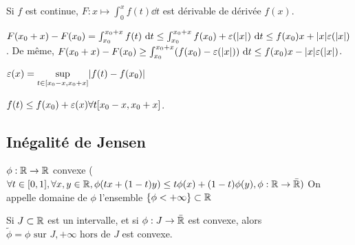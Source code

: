 \documentclass[10pt,a4paper,notitlepage ]{report}
\begin{document}
\begin{propriete}
	Si $f$ est continue, $F : x \mapsto \int_0^x f(t)\dd t$ est dérivable de dérivée $f(x)$.
\end{propriete}
\begin{demo}
	$F(x_0+x) - F(x_0) =  \int_{x_0}^{x_0+x} f(t)\ \mathrm d t \le \int_{x_0}^{x_0+x} f(x_0) + \varepsilon(|x|) \ \mathrm d t \le f(x_0)x + |x|\varepsilon(|x|)$. De même, $F(x_0+x) - F(x_0) \ge \int_{x_0}^{x_0+x}(f(x_0)-\varepsilon(|x|))\ \mathrm d t \le f(x_0)x-|x|\varepsilon(|x|)$.
	
	$\varepsilon(x) = \underset{t\in [x_0-x, x_0+x]}\sup |f(t)-f(x_0)|$
	
	$f(t) \le f(x_0) +\varepsilon(x) \forall t [x_0-x, x_0+x]$.
\end{demo}
\subsection{Inégalité de Jensen}

	$\phi:\mathbb R\rightarrow \mathbb R$ convexe ($\forall t \in [0,1],\forall x,y\in\mathbb R, \phi(tx+(1-t)y)\le t\phi(x)+(1-t)\phi(y), \phi : \mathbb R \rightarrow \bar{\mathbb R})$
On appelle domaine de $\phi$ l'ensemble $\{\phi<+\infty\} \subset \mathbb R$
\begin{rem}
	Si $J\subset \mathbb R$ est un intervalle, et si $\phi : J \rightarrow \bar{\mathbb R}$ est convexe, alors $\tilde\phi  = \phi \text{ sur } J, +\infty \text{ hors de } J$ est convexe.
\end{rem}
\end{document}
